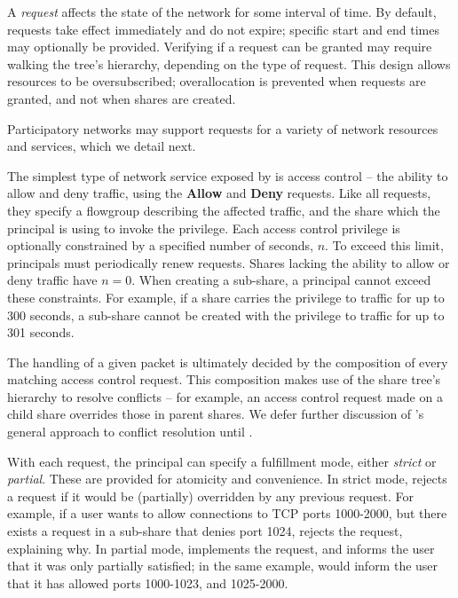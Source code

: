 A \emph{request} affects the state of the network for some interval of time. 
%
By default, requests take effect immediately and do not expire;
specific start and end times may optionally be provided.  Verifying if
a request can be granted may require walking the tree's hierarchy,
depending on the type of request.  This design allows resources to be
oversubscribed; overallocation is prevented when requests are granted,
and not when shares are created.

Participatory networks may support requests for a variety of network
resources and services, which we detail next.

The simplest type of network service exposed by \sys is access control
-- the ability to allow and deny traffic, using the \textbf{Allow} and
\textbf{Deny} requests.  Like all requests, they specify a flowgroup
describing the affected traffic, and the share which the principal is
using to invoke the privilege.
Each access control privilege is optionally constrained by a specified
number of seconds, $n$.
To exceed this limit, principals must periodically renew requests.
Shares lacking the ability to allow or deny traffic have $n = 0$.
When creating a sub-share, a principal cannot exceed these constraints. For example,
if a share carries the privilege to  traffic for up to
300 seconds, a sub-share cannot be created with the privilege to 
traffic for up to 301 seconds. %

The handling of a given packet is ultimately decided by the
composition of every matching access control request. This composition
makes use of the share tree's hierarchy to resolve conflicts -- for
example, an access control request made on a child share overrides
those in parent shares.  We defer further discussion of \sys's general
approach to conflict resolution until
.

With each request, the principal can specify a fulfillment mode, either
\emph{strict} or \emph{partial}. These are provided for atomicity and
convenience. In strict mode, \sys rejects a request if it would be
(partially) overridden by any previous request.
For example, if a user wants to allow connections to TCP ports
1000-2000, but there exists a request in a sub-share that denies port
1024, \sys rejects the request, explaining why.  In partial mode, \sys
implements the request, and informs the user that it was only
partially satisfied;
in the same example, \sys would inform the user that it has allowed
ports 1000-1023, and 1025-2000.

